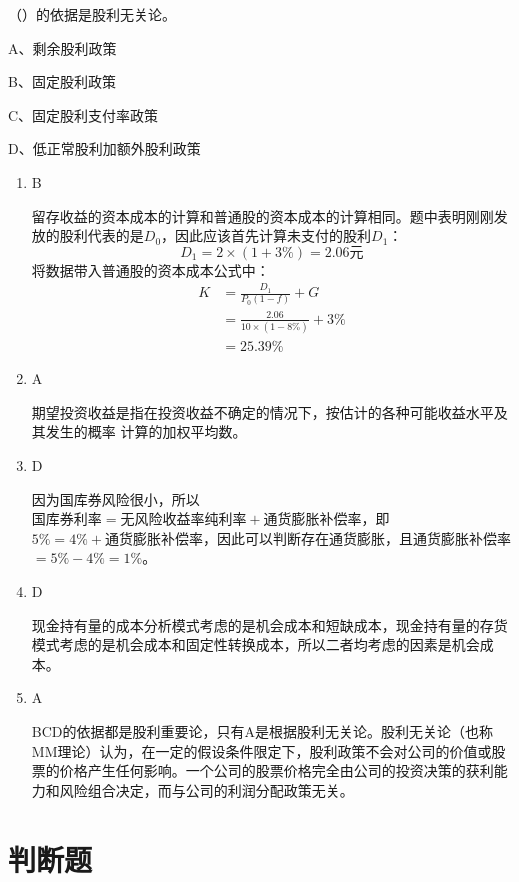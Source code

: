 \documentclass[
  10pt,
  twoside,
  openany,
  b5paper, %
  colorscheme = black, %
  xits = false,
]{qyxf-book}
\begin{document}
 （\qquad）的依据是股利无关论。

A、剩余股利政策

B、固定股利政策

C、固定股利支付率政策

D、低正常股利加额外股利政策

\begin{note}
	\begin{enumerate}
		\item B
		
		留存收益的资本成本的计算和普通股的资本成本的计算相同。题中表明刚刚发放的股利代表的是$D_0$，因此应该首先计算未支付的股利$D_1$：
		\begin{equation*}
			D_1 = 2 \times (1+3\%) = 2.06 \text{元}
		\end{equation*}
		将数据带入普通股的资本成本公式中：
		\begin{equation*}
			\begin{aligned}
				K &= \frac{D_1}{P_0(1-f)} +G \\[1.5ex] 
				&= \frac{2.06}{10 \times (1-8\%)} + 3\% \\[1.5ex]
				&=25.39\%
			\end{aligned}
		\end{equation*}
		\item A
		
		期望投资收益是指在投资收益不确定的情况下，按估计的各种可能收益水平及其发生的概率
		计算的加权平均数。
		\item D
		
		因为国库券风险很小，所以$\text{国库券利率}=\text{无风险收益率纯利率}+\text{通货膨胀补偿率}$，即$5\%=4\%+\text{通货膨胀补偿率}$，因此可以判断存在通货膨胀，且通货膨胀补偿率$=5\%-4\%=1\%$。
		\item D
		
		现金持有量的成本分析模式考虑的是机会成本和短缺成本，现金持有量的存货模式考虑的是机会成本和固定性转换成本，所以二者均考虑的因素是机会成本。
		\item A
		
		 BCD的依据都是股利重要论，只有A是根据股利无关论。股利无关论（也称MM理论）认为，在一定的假设条件限定下，股利政策不会对公司的价值或股票的价格产生任何影响。一个公司的股票价格完全由公司的投资决策的获利能力和风险组合决定，而与公司的利润分配政策无关。
	\end{enumerate}
\end{note}

\newpage

\section{判断题}
\end{document}
